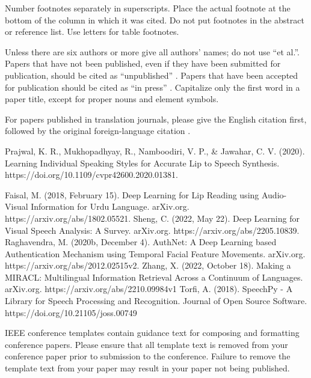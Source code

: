 \documentclass[conference]{IEEEtran}
\begin{document}
Number footnotes separately in superscripts. Place the actual footnote at 
the bottom of the column in which it was cited. Do not put footnotes in the 
abstract or reference list. Use letters for table footnotes.

Unless there are six authors or more give all authors' names; do not use 
``et al.''. Papers that have not been published, even if they have been 
submitted for publication, should be cited as ``unpublished'' \cite{b4}. Papers 
that have been accepted for publication should be cited as ``in press'' \cite{b5}. 
Capitalize only the first word in a paper title, except for proper nouns and 
element symbols.

For papers published in translation journals, please give the English 
citation first, followed by the original foreign-language citation \cite{b6}.

\begin{thebibliography}{00}
 Prajwal, K. R., Mukhopadhyay, R., Namboodiri, V. P., & Jawahar, C. V. (2020). Learning Individual Speaking Styles for Accurate Lip to Speech Synthesis. https://doi.org/10.1109/cvpr42600.2020.01381.

 Faisal, M. (2018, February 15). Deep Learning for Lip Reading using Audio-Visual Information for Urdu Language. arXiv.org. https://arxiv.org/abs/1802.05521.
 Sheng, C. (2022, May 22). Deep Learning for Visual Speech Analysis: A Survey. arXiv.org. https://arxiv.org/abs/2205.10839.
 Raghavendra, M. (2020b, December 4). AuthNet: A Deep Learning based Authentication Mechanism using Temporal Facial Feature Movements. arXiv.org. https://arxiv.org/abs/2012.02515v2.
 Zhang, X. (2022, October 18). Making a MIRACL: Multilingual Information Retrieval Across a Continuum of Languages. arXiv.org. https://arxiv.org/abs/2210.09984v1
 Torfi, A. (2018). SpeechPy - A Library for Speech Processing and Recognition. Journal of Open Source Software. https://doi.org/10.21105/joss.00749
\end{thebibliography}
\vspace{12pt}
\color{red}
IEEE conference templates contain guidance text for composing and formatting conference papers. Please ensure that all template text is removed from your conference paper prior to submission to the conference. Failure to remove the template text from your paper may result in your paper not being published.
\end{document}
